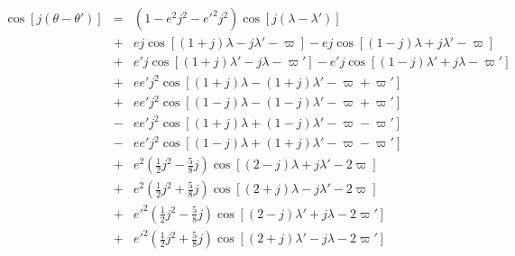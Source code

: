 \documentclass [12pt, a4paper] {article}
\begin{document}
\begin {eqnarray}
    \label{eq:cos_thetathetadot}
    \cos[j(\theta - \theta')]
    &=&
    (1- e^2j^2 - e'^2j^2)\cos[j(\lambda - \lambda')]
    \\\nonumber 
    &+&
    ej\cos[(1+j)\lambda - j\lambda' - \varpi]
    -
    ej\cos[(1-j)\lambda + j\lambda' - \varpi]
    \\\nonumber 
    &+&
    e'j\cos[(1 + j)\lambda' - j\lambda - \varpi']
    - 
    e'j\cos[(1 - j)\lambda' + j\lambda - \varpi']
    \\\nonumber 
    &+&
    ee'j^2\cos[(1+j)\lambda - (1+j)\lambda' - \varpi + \varpi']
    \\\nonumber
    &+&
    ee'j^2\cos[(1-j)\lambda - (1-j)\lambda' - \varpi + \varpi']
    \\\nonumber 
    &-&
    ee'j^2\cos[(1+j)\lambda + (1-j)\lambda' - \varpi - \varpi']
    \\\nonumber 
    &-&
    ee'j^2\cos[(1-j)\lambda + (1+j)\lambda' - \varpi - \varpi']
    \\\nonumber 
    &+&
    e^2\left(\frac{1}{2}j^2 - \frac{5}{8}j\right)\cos[(2-j)\lambda + j\lambda' - 2\varpi]
    \\\nonumber 
    &+&
    e^2\left(\frac{1}{2}j^2 + \frac{5}{8}j\right)\cos[(2+j)\lambda - j\lambda' - 2\varpi]
    \\\nonumber 
    &+&
    e'^2\left(\frac{1}{2}j^2 - \frac{5}{8}j\right)\cos[(2-j)\lambda' + j\lambda - 2\varpi']
    \\\nonumber 
    &+&
    e'^2\left(\frac{1}{2}j^2 + \frac{5}{8}j\right)\cos[(2+j)\lambda' - j\lambda - 2\varpi']
\end {eqnarray}
\end{document}
